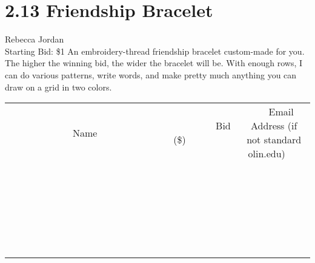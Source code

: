 \documentclass[11pt]{article}
\begin{document}
\section*{2.13 Friendship Bracelet}
Rebecca Jordan
\\
Starting Bid: \$1
\newline
An embroidery-thread friendship bracelet custom-made for you. The higher the winning bid, the wider the bracelet will be. With enough rows, I can do various patterns, write words, and make pretty much anything you can draw on a grid in two colors.
\\[6ex]
\begin{tabular}{c c c}
~~~~~~~~~~~~~Name~~~~~~~~~~~~~ & ~~~~~~~~~Bid (\$)~~~~~~~~~  & ~~~Email Address (if not standard olin.edu)~~~\\
 & & \\
\hline
 & & \\
\hline
 & & \\
\hline
 & & \\
\hline
 & & \\
\hline
 & & \\
\hline
 & & \\
\hline
 & & \\
\hline
 & & \\
\hline
 & & \\
\hline
 & & \\
\hline
 & & \\
\hline
 & & \\
\hline
 & & \\
\hline
 & & \\
\hline
 & & \\
\hline
 & & \\
\hline
 & & \\
\hline
 & & \\
\hline
 & & \\
\hline
 & & \\
\hline
 & & \\
\hline
 & & \\
\hline
 & & \\
\hline
 & & \\
\hline
 & & \\
\hline
\end{tabular}
\newpage
\end{document}
